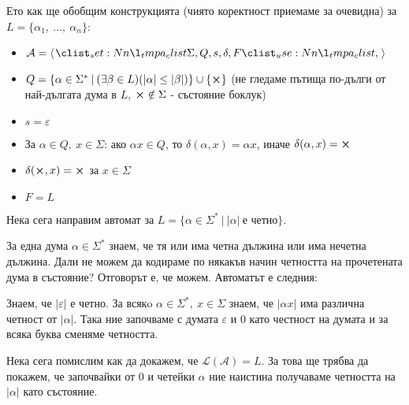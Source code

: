 Ето как ще обобщим конструкцията (чиято коректност приемаме за очевидна) за $L = \{ \alpha_1, \: \dots, \: \alpha_n \}$:
\begin{itemize}
    \item $\mathcal{A} = \opair{\Sigma, Q, s, \delta, F}$
    \item $Q = \{ \alpha \in \Sigma^* \: | \: (\exists \beta \in L) (|\alpha| \leq |\beta|) \} \cup \{ \cross \}$ (не гледаме пътища по-дълги от най-дългата дума в $L$, $\cross \notin \Sigma$ - състояние боклук)
    \item $s = \varepsilon$
    \item За $\alpha \in Q, \: x \in \Sigma$:
          ако $\alpha x \in Q$, то $\delta(\alpha, x) = \alpha x$,
          иначе $\delta(\alpha, x) = \cross$
    \item $\delta(\cross, x) = \cross$ за $x \in \Sigma$
    \item $F = L$
\end{itemize}

Нека сега направим автомат за $L = \{ \alpha \in \Sigma^* \: | \: |\alpha| \: \text{е четно} \}$.

За една дума $\alpha \in \Sigma^*$ знаем, че тя или има четна дължина или има нечетна дължина.
Дали не можем да кодираме по някакъв начин четността на прочетената дума в състояние?
Отговорът е, че можем. Автоматът е следния:

\begin{center}
\end{center}

Знаем, че $|\varepsilon|$ е четно.
За всякo $\alpha \in \Sigma^*, \: x \in \Sigma$ знаем,
че $|\alpha x|$ има различна четност от $|\alpha|$.
Така ние започваме с думата $\varepsilon$ и 0 като честност на думата и за всяка буква сменяме четността.

Нека сега помислим как да докажем, че $\mathcal{L(A)} = L$.
За това ще трябва да покажем, че започвайки от $0$ и четейки $\alpha$ ние наистина получаваме четността на $|\alpha|$ като състояние.

